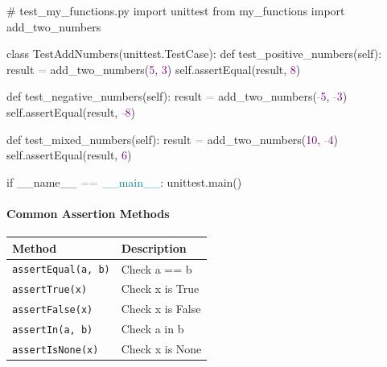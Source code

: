 \documentclass[
  justified,
  openright,
]{tufte-book}
\let\subsubsection\paragraph
\let\paragraph\paragraph
\newcommand{\CommentTok}[1]{\textcolor{MidGray}{#1}}
\newcommand{\ControlFlowTok}[1]{\textcolor{BrandBlue}{#1}}
\newcommand{\DecValTok}[1]{\textcolor{Purple}{#1}}
\newcommand{\ImportTok}[1]{\textcolor{BrandAccent}{#1}}
\newcommand{\KeywordTok}[1]{\textcolor{BrandBlue}{#1}}
\newcommand{\NormalTok}[1]{#1}
\newcommand{\OperatorTok}[1]{\textcolor{DarkGray}{#1}}
\newcommand{\StringTok}[1]{\textcolor{Teal}{#1}}
\newcommand{\VariableTok}[1]{#1}
\newenvironment{Shaded}{%
  \begin{snugshade}
}{%
  \end{snugshade}
}
\let\subsubsection\paragraph
\let\paragraph\paragraph
\begin{document}
\begin{Shaded}
\begin{Highlighting}[]
\CommentTok{\# test\_my\_functions.py}
\ImportTok{import}\NormalTok{ unittest}
\ImportTok{from}\NormalTok{ my\_functions }\ImportTok{import}\NormalTok{ add\_two\_numbers}

\KeywordTok{class}\NormalTok{ TestAddNumbers(unittest.TestCase):}
    \KeywordTok{def}\NormalTok{ test\_positive\_numbers(}\VariableTok{self}\NormalTok{):}
\NormalTok{        result }\OperatorTok{=}\NormalTok{ add\_two\_numbers(}\DecValTok{5}\NormalTok{, }\DecValTok{3}\NormalTok{)}
        \VariableTok{self}\NormalTok{.assertEqual(result, }\DecValTok{8}\NormalTok{)}

    \KeywordTok{def}\NormalTok{ test\_negative\_numbers(}\VariableTok{self}\NormalTok{):}
\NormalTok{        result }\OperatorTok{=}\NormalTok{ add\_two\_numbers(}\OperatorTok{{-}}\DecValTok{5}\NormalTok{, }\OperatorTok{{-}}\DecValTok{3}\NormalTok{)}
        \VariableTok{self}\NormalTok{.assertEqual(result, }\OperatorTok{{-}}\DecValTok{8}\NormalTok{)}

    \KeywordTok{def}\NormalTok{ test\_mixed\_numbers(}\VariableTok{self}\NormalTok{):}
\NormalTok{        result }\OperatorTok{=}\NormalTok{ add\_two\_numbers(}\DecValTok{10}\NormalTok{, }\OperatorTok{{-}}\DecValTok{4}\NormalTok{)}
        \VariableTok{self}\NormalTok{.assertEqual(result, }\DecValTok{6}\NormalTok{)}

\ControlFlowTok{if} \VariableTok{\_\_name\_\_} \OperatorTok{==} \StringTok{\textquotesingle{}\_\_main\_\_\textquotesingle{}}\NormalTok{:}
\NormalTok{    unittest.main()}
\end{Highlighting}
\end{Shaded}

\subsubsection{Common Assertion Methods}\label{common-assertion-methods}

{\def\LTcaptype{none} %
\begin{longtable}[]{@{}ll@{}}
\toprule\noalign{}
Method & Description \\
\midrule\noalign{}
\endhead
\bottomrule\noalign{}
\endlastfoot
\texttt{assertEqual(a,\ b)} & Check a == b \\
\texttt{assertTrue(x)} & Check x is True \\
\texttt{assertFalse(x)} & Check x is False \\
\texttt{assertIn(a,\ b)} & Check a in b \\
\texttt{assertIsNone(x)} & Check x is None \\
\end{longtable}
}
\end{document}
